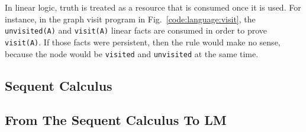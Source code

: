 In linear logic, truth is treated as a resource that is consumed once it is
used. For instance, in the graph visit program in
Fig.~\ref{code:language:visit}, the \texttt{unvisited(A)} and \texttt{visit(A)}
linear facts are consumed in order to prove \texttt{visit(A)}. If those facts
were persistent, then the rule would make no sense, because the node would be
\texttt{visited} and \texttt{unvisited} at the same time.

\subsection{Sequent Calculus}\label{sec:logic:fragment}



\subsection{From The Sequent Calculus To LM}

